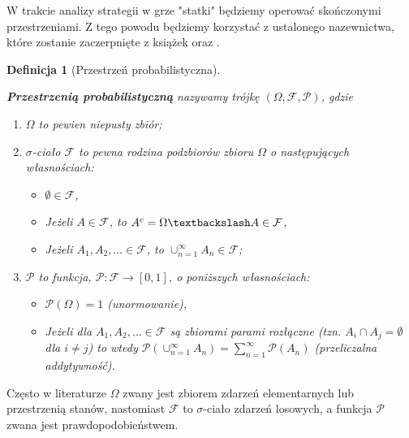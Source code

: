 \documentclass[magisterska]{pracadypl}
\newtheorem{defi}{Definicja}[section]
\begin{document}
W trakcie analizy strategii w grze "statki" będziemy operować skończonymi przestrzeniami.
Z tego powodu będziemy korzystać z ustalonego nazewnictwa, które zostanie zaczerpnięte z książek \cite{Statystyka_1} oraz \cite{Statystyka_2}.
\begin{defi}[Przestrzeń probabilistyczna]\cite{Statystyka_2} 

\textbf{Przestrzenią probabilistyczną} nazywamy trójkę $(\Omega, \mathcal {F}, \mathcal {P})$, gdzie
\begin{enumerate}
    \item $\Omega$ to pewien niepusty zbiór;
    \item $\sigma$-ciało $\mathcal {F}$ to pewna rodzina podzbiorów zbioru $\Omega$ o następujących własnościach:
    \begin{itemize}
        \item  $\emptyset \in \mathcal {F}$,
        \item Jeżeli  $A \in \mathcal {F}$, to $A^{c} = \Omega \textbackslash A \in \mathcal {F}$,
        \item Jeżeli $A_{1}, A_{2},\ldots \in \mathcal {F}$, to $\cup_{n=1}^{\infty} A_{n} \in \mathcal {F}$;
    \end{itemize}
    \item $\mathcal {P}$ to funkcja, $\mathcal {P} : \mathcal {F} \rightarrow [0, 1]$, o poniższych własnościach:
     \begin{itemize}
        \item $\mathcal{P}(\Omega) = 1$ (unormowanie),
        \item Jeżeli dla $A_{1}, A_{2}, \ldots \in \mathcal {F}$ są zbiorami parami rozłączne (tzn. $ A_{i} \cap A_{j} = \emptyset $ dla $i \neq j$) to wtedy $\mathcal{P}(\cup_{n=1}^{\infty} A_{n}) = \sum_{n=1}^{\infty} \mathcal{P}(A_{n})$ (przeliczalna addytywność).
    \end{itemize}
\end{enumerate}

\end{defi}

Często w literaturze $\Omega$ zwany jest zbiorem zdarzeń elementarnych lub przestrzenią stanów, nastomiast $\mathcal {F}$ to $\sigma$-ciało zdarzeń losowych, a funkcja $\mathcal {P}$  zwana jest prawdopodobieństwem.
\end{document}
